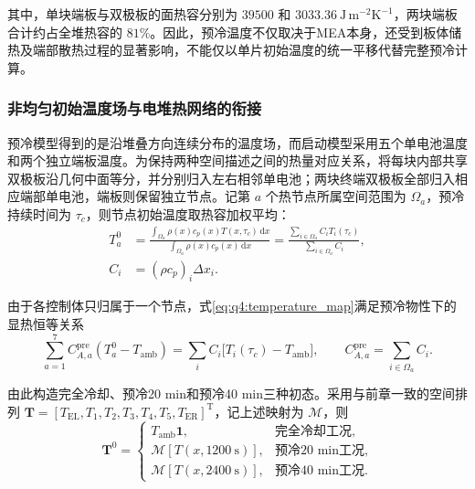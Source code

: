 其中，单块端板与双极板的面热容分别为 $39500$ 和 $3033.36\ \mathrm{J\,m^{-2}K^{-1}}$，两块端板合计约占全堆热容的 $81\%$。因此，预冷温度不仅取决于MEA本身，还受到板体储热及端部散热过程的显著影响，不能仅以单片初始温度的统一平移代替完整预冷计算。

\subsubsection{非均匀初始温度场与电堆热网络的衔接}

预冷模型得到的是沿堆叠方向连续分布的温度场，而启动模型采用五个单电池温度和两个独立端板温度。为保持两种空间描述之间的热量对应关系，将每块内部共享双极板沿几何中面等分，并分别归入左右相邻单电池；两块终端双极板全部归入相应端部单电池，端板则保留独立节点。记第 $a$ 个热节点所属空间范围为 $\Omega_a$，预冷持续时间为 $\tau_c$，则节点初始温度取热容加权平均：
\begin{equation}
\begin{aligned}
T_a^0&=\frac{\displaystyle\int_{\Omega_a}\rho(x)c_p(x)T(x,\tau_c)\,\mathrm dx}
{\displaystyle\int_{\Omega_a}\rho(x)c_p(x)\,\mathrm dx}
=\frac{\displaystyle\sum_{i\in\Omega_a}C_iT_i(\tau_c)}
{\displaystyle\sum_{i\in\Omega_a}C_i},\\
C_i&=(\rho c_p)_i\Delta x_i.
\end{aligned}
\tag{7-7}\label{eq:q4:temperature_map}
\end{equation}

由于各控制体只归属于一个节点，式\eqref{eq:q4:temperature_map}满足预冷物性下的显热恒等关系
\begin{equation}
\sum_{a=1}^{7}C_{A,a}^{\mathrm{pre}}(T_a^0-T_{\mathrm{amb}})
=\sum_iC_i\big[T_i(\tau_c)-T_{\mathrm{amb}}\big],\qquad
C_{A,a}^{\mathrm{pre}}=\sum_{i\in\Omega_a}C_i.
\tag{7-8}\label{eq:q4:map_energy}
\end{equation}

由此构造完全冷却、预冷20 min和预冷40 min三种初态。采用与前章一致的空间排列 $\boldsymbol T=[T_{\mathrm{EL}},T_1,T_2,T_3,T_4,T_5,T_{\mathrm{ER}}]^{\mathrm T}$，记上述映射为 $\mathcal M$，则
\begin{equation}
\boldsymbol T^0=\begin{cases}
T_{\mathrm{amb}}\boldsymbol 1, & \text{完全冷却工况},\\
\mathcal M[T(x,1200\ \mathrm s)], & \text{预冷20 min工况},\\
\mathcal M[T(x,2400\ \mathrm s)], & \text{预冷40 min工况}.
\end{cases}
\tag{7-9}\label{eq:q4:three_initial_states}
\end{equation}

